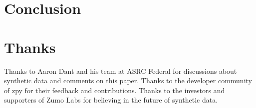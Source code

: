 \documentclass{article}
\begin{document}
\section{Conclusion}
\label{sec:conclusion}



\section{Thanks}
\label{sec:thanks}

Thanks to Aaron Dant and his team at ASRC Federal for discussions about synthetic data and comments on this paper. Thanks to the developer community of zpy for their feedback and contributions. Thanks to the investors and supporters of Zumo Labs for believing in the future of synthetic data.



\end{document}
